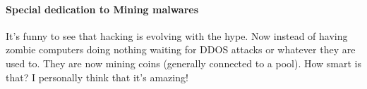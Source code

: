 \paragraph{Special dedication to Mining malwares}
It's funny to see that hacking is evolving with the hype. Now instead of having zombie computers doing nothing waiting for DDOS attacks or whatever they are used to. They are now mining coins (generally connected to a pool). How smart is that? I personally think that it's amazing!

